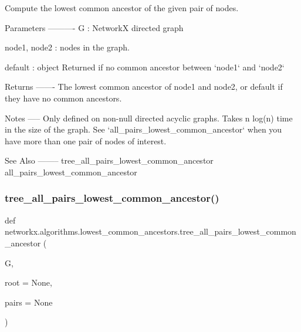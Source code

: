 \begin{DoxyVerb}Compute the lowest common ancestor of the given pair of nodes.

Parameters
----------
G : NetworkX directed graph

node1, node2 : nodes in the graph.

default : object
    Returned if no common ancestor between `node1` and `node2`

Returns
-------
The lowest common ancestor of node1 and node2,
or default if they have no common ancestors.

Notes
-----
Only defined on non-null directed acyclic graphs.
Takes n log(n) time in the size of the graph.
See `all_pairs_lowest_common_ancestor` when you have
more than one pair of nodes of interest.

See Also
--------
tree_all_pairs_lowest_common_ancestor
all_pairs_lowest_common_ancestor
\end{DoxyVerb}
 \mbox{\label{namespacenetworkx_1_1algorithms_1_1lowest__common__ancestors_ade5ca883bc479d9fbdb18f62e304d50c}} 
\subsubsection{\texorpdfstring{tree\+\_\+all\+\_\+pairs\+\_\+lowest\+\_\+common\+\_\+ancestor()}{tree\_all\_pairs\_lowest\_common\_ancestor()}}
{\footnotesize\ttfamily def networkx.\+algorithms.\+lowest\+\_\+common\+\_\+ancestors.\+tree\+\_\+all\+\_\+pairs\+\_\+lowest\+\_\+common\+\_\+ancestor (\begin{DoxyParamCaption}\item[{}]{G,  }\item[{}]{root = {\ttfamily None},  }\item[{}]{pairs = {\ttfamily None} }\end{DoxyParamCaption})}

